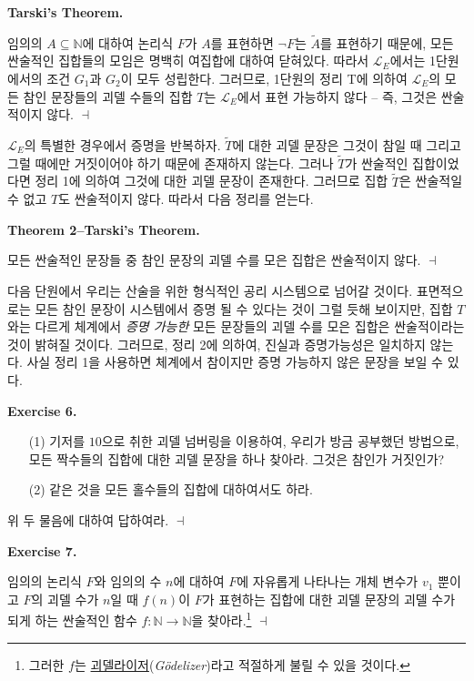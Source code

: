 \documentclass[12pt]{paper}
\newenvironment{context}[1][]
{ \noindent \textbf{{#1}.}
}
{ \hfill $ \dashv $ }
\begin{document}
\begin{context}[Tarski's Theorem]
임의의 $A \subseteq \mathbb{N}$에 대하여 논리식 $F$가 $A$를 표현하면 $\lnot F$는 $\widetilde{A}$를 표현하기 때문에,
모든 싼술적인 집합들의 모임은 명백히 여집합에 대하여 닫혀있다.
따라서 $\mathcal{L}_{E}$에서는 1단원에서의 조건 $G_1$과 $G_2$이 모두 성립한다.
그러므로, 1단원의 정리 T에 의하여 $\mathcal{L}_{E}$의 모든 참인 문장들의 괴델 수들의 집합 $T$는 $\mathcal{L}_{E}$에서 표현 가능하지 않다 --
즉, 그것은 싼술적이지 않다.
\end{context}

$\mathcal{L}_{E}$의 특별한 경우에서 증명을 반복하자.
$\widetilde{T}$에 대한 괴델 문장은 그것이 참일 때 그리고 그럴 때에만 거짓이어야 하기 때문에 존재하지 않는다.
그러나 $\widetilde{T}$가 싼술적인 집합이었다면 정리 1에 의하여 그것에 대한 괴델 문장이 존재한다.
그러므로 집합 $\widetilde{T}$은 싼술적일 수 없고 $T$도 싼술적이지 않다.
따라서 다음 정리를 얻는다.

\begin{context}[Theorem 2--Tarski's Theorem]
모든 싼술적인 문장들 중 참인 문장의 괴델 수를 모은 집합은 싼술적이지 않다.
\end{context}

다음 단원에서 우리는 산술을 위한 형식적인 공리 시스템으로 넘어갈 것이다.
표면적으로는 모든 참인 문장이 시스템에서 증명 될 수 있다는 것이 그럴 듯해 보이지만,
집합 $T$와는 다르게 체계에서 \textit{증명 가능한} 모든 문장들의 괴델 수를 모은 집합은 싼술적이라는 것이 밝혀질 것이다.
그러므로, 정리 2에 의하여, 진실과 증명가능성은 일치하지 않는다.
사실 정리 1을 사용하면 체계에서 참이지만 증명 가능하지 않은 문장을 보일 수 있다.

\begin{context}[Exercise 6]
\begin{enumerate}
\item[(1)] 기저를 $10$으로 취한 괴델 넘버링을 이용하여, 우리가 방금 공부했던 방법으로, 모든 짝수들의 집합에 대한 괴델 문장을 하나 찾아라.
그것은 참인가 거짓인가?
\item[(2)] 같은 것을 모든 홀수들의 집합에 대하여서도 하라.
\end{enumerate}

위 두 물음에 대하여 답하여라.
\end{context}

\begin{context}[Exercise 7]
임의의 논리식 $F$와 임의의 수 $n$에 대하여 $F$에 자유롭게 나타나는 개체 변수가 $v_1$ 뿐이고 $F$의 괴델 수가 $n$일 때 $f \left( n \right)$이 $F$가 표현하는 집합에 대한 괴델 문장의 괴델 수가 되게 하는 싼술적인 함수 $f : \mathbb{N} \to \mathbb{N}$을 찾아라.\footnote
{
그러한 $f$는 \underline{괴델라이저}(\textit{G\"odelizer})라고 적절하게 불릴 수 있을 것이다.
}
\end{context}
\end{document}
